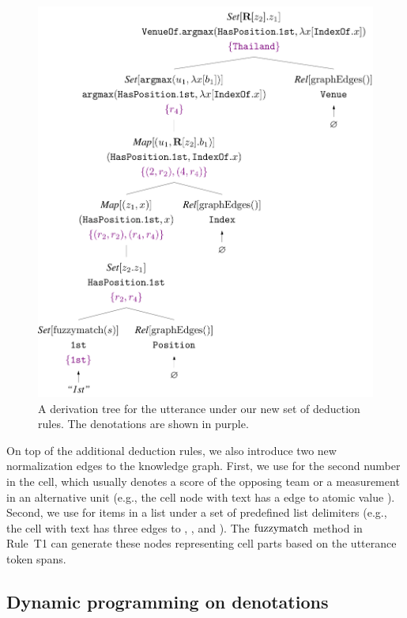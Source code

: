 \begin{figure}[t]
\centering
\includegraphics[scale=0.35]{sfig/parsetrees.slides/dpdParse.pdf}
\caption[Derivation tree of the running example under the  construct.]
{A derivation tree for the utterance \runningEx
under our new set of deduction rules.
The denotations are shown in {\color[rgb]{.5, 0, .5}purple}.}
\label{fig:dpd-parse-ex}
\end{figure}

On top of the additional deduction rules,
we also introduce two new normalization edges to
the knowledge graph.
First, we use
 for the second number in the cell,
which usually denotes
a score of the opposing team or a measurement
in an alternative unit
(e.g., the cell node with text  has
a  edge to atomic value ).
Second, we use
 for items in a list
under a set of predefined list delimiters
(e.g., the cell with text
 has three  edges
to , , and ).
The $\mathrm{fuzzymatch}$ method in Rule~T1
can generate these nodes representing cell parts
based on the utterance token spans.

\subsection{Dynamic programming on denotations}

